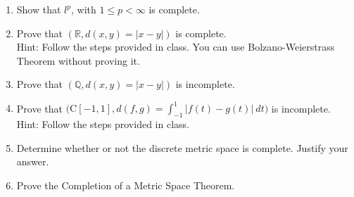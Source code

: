 \documentclass[12pt]{article}
\newcommand{\mR}{\mathbb{R}}
\newcommand{\mQ}{\mathbb{Q}}
\begin{document}
\begin{enumerate}
\item Show that $l^p$, with $1 \leq p < \infty$ is
    complete.
\begin{mybox}

    \vspace*{15mm}
\end{mybox}
 
\item Prove that $(\mR, d(x,y) = |x-y|)$ is complete.\\ 
    Hint: Follow the steps provided in class.
    You can use Bolzano-Weierstrass Theorem without
    proving it.
\begin{mybox}

    \vspace*{15mm}
\end{mybox}
 
\item Prove that $(\mQ, d(x,y) = |x-y|)$ is incomplete.
\begin{mybox}

    \vspace*{15mm}
\end{mybox}
 
\item Prove that $\Big(\text{C}[-1,1], d(f,g) =
    \int_{-1}^1|f(t) - g(t)| \ dt\Big)$ is incomplete. \\
    Hint: Follow the steps provided in class.
\begin{mybox}

    \vspace*{15mm}
\end{mybox}
 
\item Determine whether or not the discrete metric
    space is complete. Justify your answer.
\begin{mybox}

    \vspace*{15mm}
\end{mybox}
 
\item Prove the Completion of a Metric Space Theorem. 
\begin{mybox}

    \vspace*{15mm}
\end{mybox}
 
 
\end{enumerate}
\end{document}

